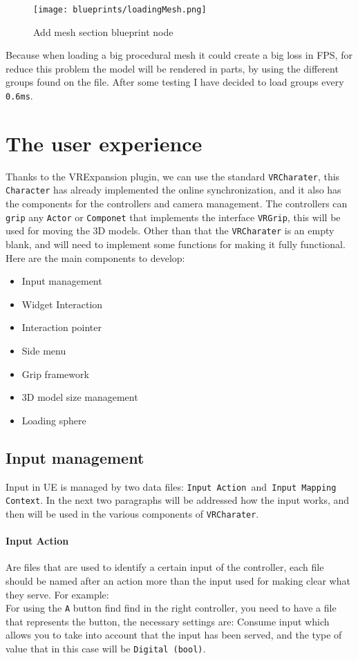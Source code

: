 \begin{figure}[h]
    \centering
    \texttt{[image: blueprints/loadingMesh.png]}
    \caption{Add mesh section blueprint node}
    \label{fig:loadingMesh}
\end{figure}
\noindent
Because when loading a big procedural mesh it could create a big loss in \ac{FPS}, for reduce this problem the model will be rendered in parts, by using the different groups found on the file. After some testing I have decided to load groups every \verb|0.6ms|. 

\section{The user experience}
\noindent
Thanks to the VRExpansion plugin, we can use the standard \verb|VRCharater|, this \verb*|Character| has already implemented the online synchronization, and it also has the components for the controllers and camera management.
The controllers can \verb|grip| any \verb|Actor| or \verb|Componet| that implements the interface \verb|VRGrip|, this will be used for  moving the 3D models.
Other than that the \verb|VRCharater| is an empty blank, and will need to implement some functions for making it fully functional.\\
Here are the main components to develop:

\begin{itemize}
    \item Input management
    \item Widget Interaction
    \item Interaction pointer
    \item Side menu
    \item Grip framework
    \item 3D model size management    
    \item Loading sphere
\end{itemize}

\subsection{Input management}
\noindent
Input in \ac{UE} is managed by two data files: \verb|Input Action |and\verb| Input Mapping Context|.
In the next two paragraphs will be addressed how the input works, and then will be used in the various components of \verb|VRCharater|.

\paragraph{Input Action}
Are files that are used to identify a certain input of the controller, each file should be named after an action more than the input used for making clear what they serve.
For example:\\
For using the \verb|A| button find find in the right controller,
you need to have a file that represents the button,
the necessary settings are: Consume input which allows you to take into account that the input has been served,
and the type of value that in this case will be \verb|Digital (bool)|.


